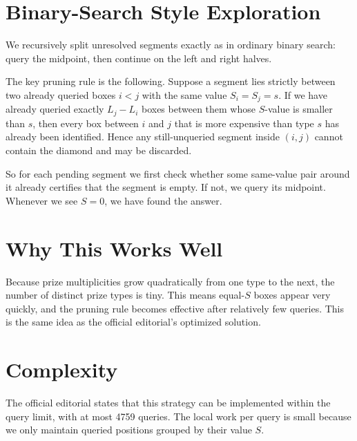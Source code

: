 \documentclass[11pt,a4paper]{article}
\begin{document}
\section{Binary-Search Style Exploration}

We recursively split unresolved segments exactly as in ordinary binary search:
query the midpoint, then continue on the left and right halves.

The key pruning rule is the following. Suppose a segment lies strictly between
two already queried boxes $i < j$ with the same value $S_i = S_j = s$. If we
have already queried exactly $L_j - L_i$ boxes between them whose $S$-value is
smaller than $s$, then every box between $i$ and $j$ that is more expensive
than type $s$ has already been identified. Hence any still-unqueried segment
inside $(i, j)$ cannot contain the diamond and may be discarded.

So for each pending segment we first check whether some same-value pair around it
already certifies that the segment is empty. If not, we query its midpoint.
Whenever we see $S=0$, we have found the answer.

\section{Why This Works Well}

Because prize multiplicities grow quadratically from one type to the next, the
number of distinct prize types is tiny. This means equal-$S$ boxes appear very
quickly, and the pruning rule becomes effective after relatively few queries.
This is the same idea as the official editorial's optimized solution.

\section{Complexity}

The official editorial states that this strategy can be implemented within the
query limit, with at most 4759 queries. The local work per query is small
because we only maintain queried positions grouped by their value $S$.
\end{document}
